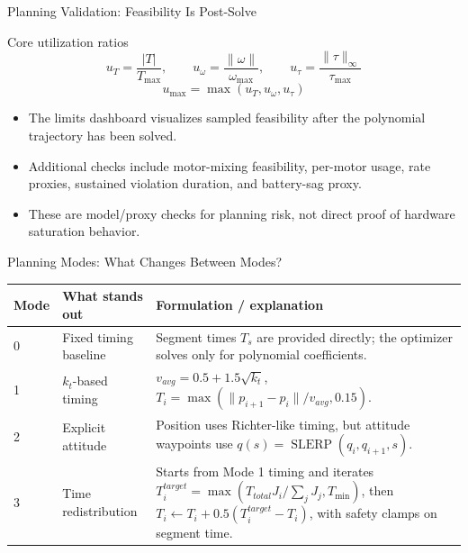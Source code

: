 \documentclass[aspectratio=169,11pt]{beamer}
\begin{document}
\begin{frame}{Planning Validation: Feasibility Is Post-Solve}
\begin{block}{Core utilization ratios}
\[
u_T=\frac{|T|}{T_{\max}},
\qquad
u_\omega=\frac{\|\omega\|}{\omega_{\max}},
\qquad
u_\tau=\frac{\|\tau\|_\infty}{\tau_{\max}}
\]
\[
u_{\max}=\max(u_T,u_\omega,u_\tau)
\]
\end{block}

\begin{itemize}
  \item The limits dashboard visualizes sampled feasibility after the polynomial trajectory has been solved.
  \item Additional checks include motor-mixing feasibility, per-motor usage, rate proxies, sustained violation duration, and battery-sag proxy.
  \item These are model/proxy checks for planning risk, not direct proof of hardware saturation behavior.
\end{itemize}
\end{frame}

\begin{frame}{Planning Modes: What Changes Between Modes?}
\small
\begin{tabular}{p{}p{}p{}}
\toprule
Mode & What stands out & Formulation / explanation \\
\midrule
0 & Fixed timing baseline & Segment times \(T_s\) are provided directly; the optimizer solves only for polynomial coefficients. \\
1 & \(k_t\)-based timing & \(v_{avg}=0.5+1.5\sqrt{k_t}\), \quad \(T_i=\max(\|p_{i+1}-p_i\|/v_{avg},0.15)\). \\
2 & Explicit attitude & Position uses Richter-like timing, but attitude waypoints use \(q(s)=\operatorname{SLERP}(q_i,q_{i+1},s)\). \\
3 & Time redistribution & Starts from Mode 1 timing and iterates \(T_i^{target}=\max(T_{total}J_i/\sum_jJ_j,T_{\min})\), then \(T_i\leftarrow T_i+0.5(T_i^{target}-T_i)\), with safety clamps on segment time. \\
\bottomrule
\end{tabular}
\end{frame}
\end{document}
